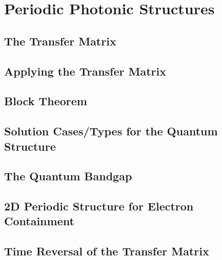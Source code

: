 \documentclass[../../Quantum-Technologies-Notes]{subfiles}
\begin{document}
	
	\ifSubfilesClassLoaded{ \pagestyle{fancy} }{}
	
	\section{Periodic Photonic Structures}\vskip0pt
		{\quad\quad\color{heading}}
			
		\subsection{The Transfer Matrix}
		
		
		\subsection{Applying the Transfer Matrix}
		
		
		\subsection{Block Theorem}
		
		
		\subsection{Solution Cases/Types for the Quantum Structure}
		
		
		\subsection{The Quantum Bandgap}
		
		
		\subsection{2D Periodic Structure for Electron Containment}
		
		
		\subsection{Time Reversal of the Transfer Matrix}
		
		
		\pagebreak
\end{document}
